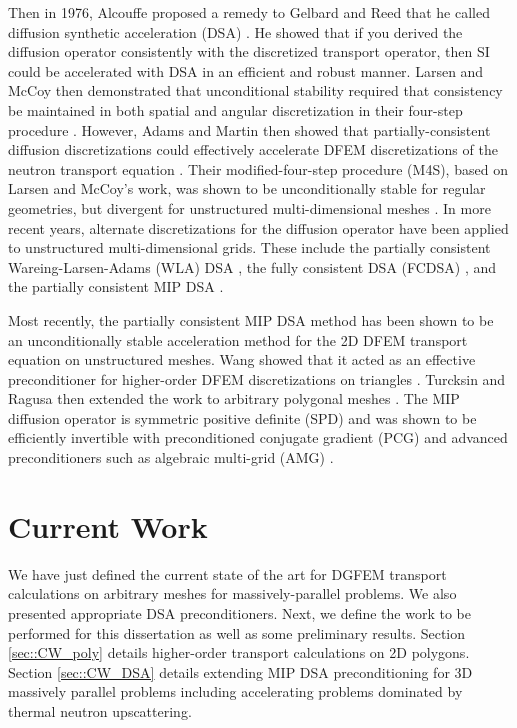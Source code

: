 \documentclass[11pt]{article}
\begin{document}
Then in 1976, Alcouffe proposed a remedy to Gelbard and Reed that he called diffusion synthetic acceleration (DSA) \cite{alcouffe1976stable,alcouffe1977DSA,alcouffe1977diffusion}. He showed that if you derived the diffusion operator consistently with the discretized transport operator, then SI could be accelerated with DSA in an efficient and robust manner. Larsen and McCoy then demonstrated that unconditional stability required that consistency be maintained in both spatial and angular discretization in their four-step procedure \cite{larsen1982unconditionally_I,larsen1982unconditionally_II}. However, Adams and Martin then showed that partially-consistent diffusion discretizations could effectively accelerate DFEM discretizations of the neutron transport equation \cite{ref::dsa_DFEM_adams_martin}. Their modified-four-step procedure (M4S), based on Larsen and McCoy's work, was shown to be unconditionally stable for regular geometries, but divergent for unstructured multi-dimensional meshes \cite{warsa2002fully}. In more recent years, alternate discretizations for the diffusion operator have been applied to unstructured multi-dimensional grids. These include the partially consistent Wareing-Larsen-Adams (WLA) DSA \cite{ref::WLA_DSA}, the fully consistent DSA (FCDSA) \cite{warsa2002fully}, and the partially consistent MIP DSA \cite{ref::DSA_wang_ragusa,wang2009adaptive,turcksin2014discontinuous}.

Most recently, the partially consistent MIP DSA method has been shown to be an unconditionally stable acceleration method for the 2D DFEM transport equation on unstructured meshes. Wang showed that it acted as an effective preconditioner for higher-order DFEM discretizations on triangles \cite{ref::DSA_wang_ragusa,wang2009adaptive}. Turcksin and Ragusa then extended the work to arbitrary polygonal meshes \cite{turcksin2014discontinuous}. The MIP diffusion operator is symmetric positive definite (SPD) and was shown to be efficiently invertible with preconditioned conjugate gradient (PCG) and advanced preconditioners such as algebraic multi-grid (AMG) \cite{turcksin2014discontinuous}.

\section{Current Work}
\label{sec::CW}

We have just defined the current state of the art for DGFEM transport calculations on arbitrary meshes for massively-parallel problems. We also presented appropriate DSA preconditioners. Next, we define the work to be performed for this dissertation as well as some preliminary results. Section \ref{sec::CW_poly} details higher-order transport calculations on 2D polygons. Section \ref{sec::CW_DSA} details extending MIP DSA preconditioning for 3D massively parallel problems including accelerating problems dominated by thermal neutron upscattering.
\end{document}
